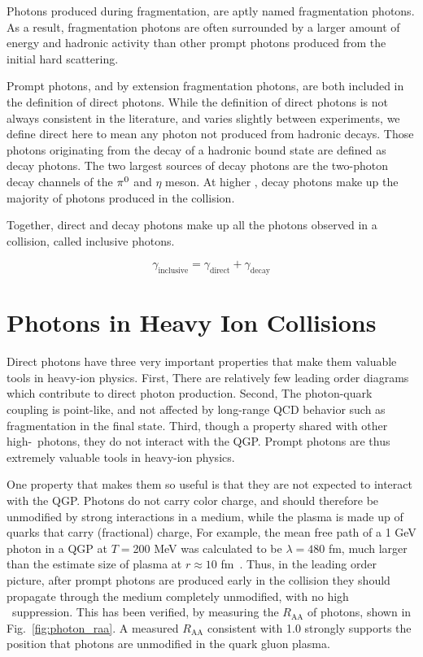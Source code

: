 
Photons produced during fragmentation, are aptly named fragmentation photons. As a result, fragmentation photons are often surrounded by a larger amount of energy and hadronic activity than other prompt photons produced from the initial hard scattering.

Prompt photons, and by extension fragmentation photons, are both included in the definition of direct photons. While the definition of direct photons is not always consistent in the literature, and varies slightly between experiments, we define direct here to mean any photon not produced from hadronic decays. Those photons originating from the decay of a hadronic bound state are defined as decay photons. The two largest sources of decay photons are the two-photon decay channels of the $\pi^0$ and $\eta$ meson. At higher \pt, decay photons make up the majority of photons produced in the collision.

Together, direct and decay photons make up all the photons observed in a collision, called inclusive photons.

\begin{equation}
  \gamma_\mathrm{inclusive} = \gamma_\mathrm{direct} + \gamma_\mathrm{decay}
\end{equation}

\section{Photons in Heavy Ion Collisions}
Direct photons have three very important properties that make them valuable tools in heavy-ion physics. First, There are relatively few leading order diagrams which contribute to direct photon production. Second, The photon-quark coupling is point-like, and not affected by long-range QCD behavior such as fragmentation in the final state. Third, though a property shared with other high-\pt~photons, they do not interact with the QGP. Prompt photons are thus extremely valuable tools in heavy-ion physics. 

One property that makes them so useful is that they are not expected to interact with the QGP. Photons do not carry color charge, and should therefore be unmodified by strong interactions in a medium, while the plasma is made up of quarks that carry (fractional) charge, For example, the mean free path of a 1 GeV photon in a QGP at $T=$200 MeV was calculated to be  $\lambda=480$ fm, much larger than the estimate size of plasma at  $r \approx 10$ fm~\cite{David2020}. Thus, in the leading order picture, after prompt photons are produced early in the collision they should propagate through the medium completely unmodified, with no high \pt~suppression. This has been verified, by measuring the $R_\mathrm{AA}$ of photons, shown in Fig.~\ref{fig:photon_raa}. A measured $R_\mathrm{AA}$ consistent with 1.0 strongly supports the position that photons are unmodified in the quark gluon plasma.

